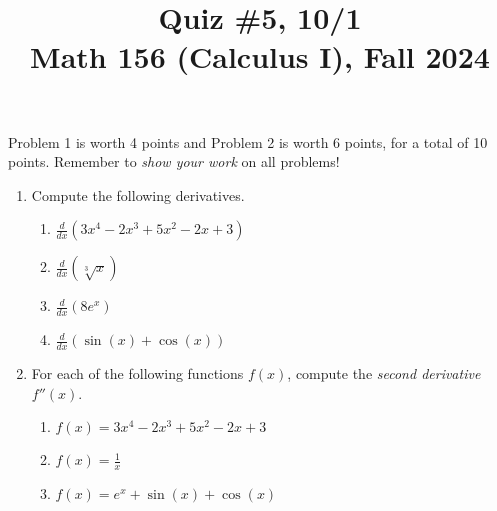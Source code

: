 \documentclass[11pt]{article}
\title{Quiz \#5, 10/1 \\ Math 156 (Calculus I), Fall 2024}
\date{}
\begin{document}
\maketitle

\thispagestyle{empty}

\vspace{-1cm}

Problem 1 is worth 4 points and Problem 2 is worth 6 points, for a total of 10 points. Remember to \emph{show your work} on all problems!

\begin{enumerate}
\item Compute the following derivatives.
\begin{enumerate}
\item $\displaystyle \frac{d}{dx} ( 3x^4 - 2x^3 + 5x^2 - 2x + 3 )$
\item $\displaystyle \frac{d}{dx} ( \sqrt[3]{x}) $
\item $\displaystyle \frac{d}{dx} ( 8e^{x}) $
\item $\displaystyle \frac{d}{dx} ( \sin(x) + \cos(x) )$
\end{enumerate}

\vspace{2.1in}

\item For each of the following functions $f(x)$, compute the \emph{second derivative} $f''(x)$.
\begin{enumerate}
\item $f(x) = 3x^4 - 2x^3 + 5x^2 - 2x + 3$
\item $f(x) = \displaystyle \frac{1}{x}$
\item $f(x) = e^x + \sin(x) + \cos(x)$
\end{enumerate}

\end{enumerate}
\end{document}
